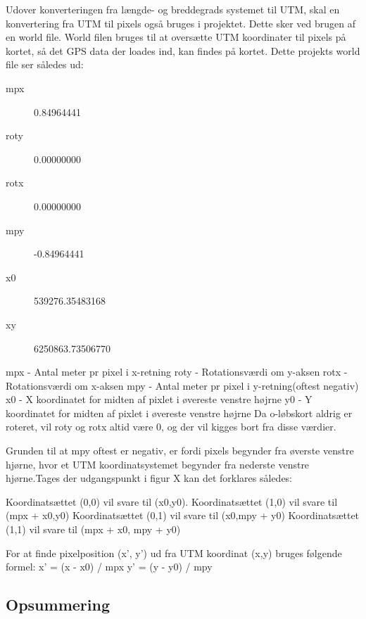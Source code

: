 Udover konverteringen fra længde- og breddegrads systemet til UTM, skal en konvertering fra UTM til pixels også bruges i projektet. Dette sker ved brugen af en world file. World filen bruges til at oversætte UTM koordinater til pixels på kortet, så det GPS data der loades ind, kan findes på kortet. Dette projekts world file ser således ud:
\begin{description}
\item[mpx] 0.84964441
\item[roty] 0.00000000
\item[rotx] 0.00000000
\item[mpy] -0.84964441
\item[x0] 539276.35483168
\item[xy] 6250863.73506770
\end{description}
mpx - Antal meter pr pixel i x-retning\newline
roty - Rotationsværdi om y-aksen\newline
rotx - Rotationsværdi om x-aksen\newline
mpy - Antal meter pr pixel i y-retning(oftest negativ)\newline
x0 - X koordinatet for midten af pixlet i øvereste venstre højrne\newline
y0 - Y koordinatet for midten af pixlet i øvereste venstre højrne\newline
Da o-løbskort aldrig er roteret, vil roty og rotx altid være 0, og der vil kigges bort fra disse værdier.

Grunden til at mpy oftest er negativ, er fordi pixels begynder fra øverste venstre hjørne, hvor et UTM koordinatsystemet begynder fra nederste venstre hjørne.Tages der udgangspunkt i figur X kan det forklares således:

Koordinatsættet (0,0) vil svare til (x0,y0).
Koordinatsættet (1,0) vil svare til (mpx + x0,y0)
Koordinatsættet (0,1) vil svare til (x0,mpy + y0)
Koordinatsættet (1,1) vil svare til (mpx + x0, mpy + y0)

For at finde pixelposition (x’, y’) ud fra UTM koordinat (x,y) bruges følgende formel:\newline
x’ = (x - x0) / mpx\newline
y’ = (y - y0) / mpy\newline

\subsection{Opsummering}
